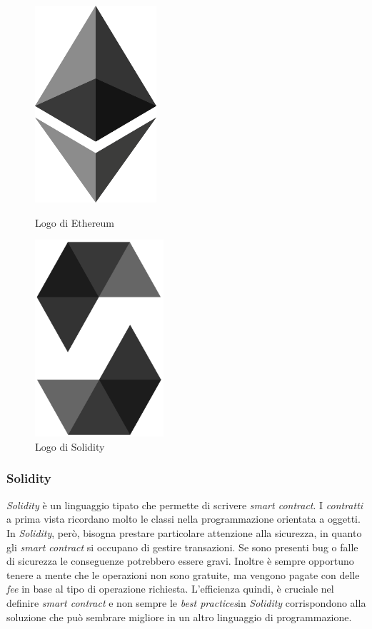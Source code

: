 \begin{figure}[!htb]
   \begin{minipage}{0.48\textwidth}
     \centering
     \includegraphics[width=0.4\textwidth]{./immagini/logo_ethereum}
     \caption{Logo di Ethereum}
   \end{minipage}\hfill
   \begin{minipage}{0.48\textwidth}
     \centering
     \includegraphics[width=0.425\textwidth]{./immagini/logo_solidity}
     \caption{Logo di Solidity}
   \end{minipage}
\end{figure}

\subsubsection{Solidity}
\textit{Solidity} è un linguaggio tipato che permette di scrivere \textit{smart contract}. I \textit{contratti} a prima vista ricordano molto le classi nella programmazione orientata a oggetti. In \textit{Solidity}, però, bisogna prestare particolare attenzione alla sicurezza, in quanto gli \textit{smart contract} si occupano di gestire transazioni. Se sono presenti bug o falle di sicurezza le conseguenze potrebbero essere gravi. Inoltre è sempre opportuno tenere a mente che le operazioni non sono gratuite, ma vengono pagate con delle \textit{fee} in base al tipo di operazione richiesta. L'efficienza quindi, è cruciale nel definire \textit{smart contract} e non sempre le \emph{\gls{best practices}}\glsfirstoccur in \textit{Solidity} corrispondono alla soluzione che può sembrare migliore in un altro linguaggio di programmazione.

